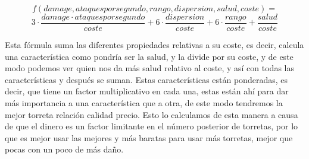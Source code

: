 $$ f(damage, ataques por segundo, rango, dispersion, salud, coste) = $$
$$3 \cdot \frac{damage \cdot ataques por segundo}{coste} + 6 \cdot \frac{dispersion}{coste} + 6 \cdot \frac{rango}{coste} + \frac{salud}{coste} $$

Esta fórmula suma las diferentes propiedades relativas a su coste, es decir, calcula una característica como pondría ser la salud, y la divide por su coste, y de este modo podemos ver quien nos da más salud relativo al coste, y así con todas las características y después se suman. Estas características están ponderadas, es decir, que tiene un factor multiplicativo en cada una, estas están ahí para dar más importancia a una característica que a otra, de este modo tendremos la mejor torreta relación calidad precio. Esto lo calculamos de esta manera a causa de que el dinero es un factor limitante en el número posterior de torretas, por lo que es mejor usar las mejores y más baratas para usar más torretas, mejor que pocas con un poco de más daño.

